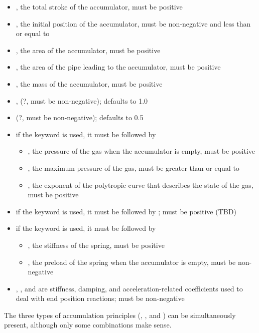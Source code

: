 \begin{itemize}
\item {}, the total stroke of the accumulator, must be positive
\item {}, the initial position of the accumulator, must be non-negative and less than or equal to 
\item {}, the area of the accumulator, must be positive
\item {}, the area of the pipe leading to the accumulator, must be positive
\item {}, the mass of the accumulator, must be positive
\item {}, (?, must be non-negative); defaults to 1.0
\item {} (?, must be non-negative); defaults to 0.5
\item if the keyword  is used, it must be followed by
\begin{itemize}
\item {}, the pressure of the gas when the accumulator is empty, must be positive
\item {}, the maximum pressure of the gas, must be greater than or equal to 
\item {}, the exponent of the polytropic curve that describes the state of the gas, must be positive
\end{itemize}
\item if the keyword  is used, it must be followed by ; must be positive (TBD)
\item if the keyword  is used, it must be followed by
\begin{itemize}
\item {}, the stiffness of the spring, must be positive
\item {}, the preload of the spring when the accumulator is empty, must be non-negative
\end{itemize}
\item {}, , and  are stiffness, damping, and acceleration-related coefficients used to deal with end position reactions; must be non-negative
\end{itemize}
The three types of accumulation principles (, , and ) can be simultaneously present, although only some combinations make sense.



